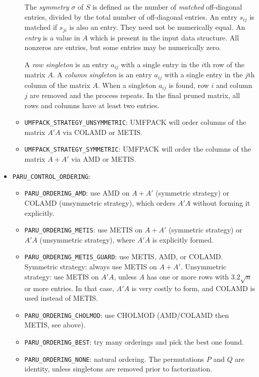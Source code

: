 \documentclass[12pt]{article}
\begin{document}
\begin{itemize}
\begin{itemize}
            The {\em symmetry} $\sigma$ of ${S}$ is defined as the number of
            {\em matched} off-diagonal entries, divided by the total number of
            off-diagonal entries.  An entry $s_{ij}$ is matched if $s_{ji}$ is
            also an entry.  They need not be numerically equal.  An {\em entry}
            is a value in $A$ which is present in the input data structure.
            All nonzeros are entries, but some entries may be numerically zero.

            A {\em row singleton} is an entry $a_{ij}$ with a single entry in
            the $i$th row of the matrix $A$.  A {\em column singleton} is an
            entry $a_{ij}$ with a single entry in the $j$th column of the
            matrix $A$.  When a singleton $a_{ij}$ is found, row $i$ and column
            $j$ are removed and the process repeats.  In the final pruned
            matrix, all rows and columns have at least two entries.

        \item \verb'UMFPACK_STRATEGY_UNSYMMETRIC': UMFPACK will order columns
            of the matrix $A'A$ via COLAMD or METIS.

        \item \verb'UMFPACK_STRATEGY_SYMMETRIC': UMFPACK will order the columns
            of the matrix $A+A'$ via AMD or METIS.

        \end{itemize}

    \item \verb'PARU_CONTROL_ORDERING': %

        \begin{itemize}
        \item \verb'PARU_ORDERING_AMD':
            use AMD on $A+A'$ (symmetric strategy) or COLAMD (unsymmetric
            strategy), which orders $A'A$ without forming it explicitly.
        \item \verb'PARU_ORDERING_METIS': use METIS on $A+A'$ (symmetric
            strategy) or $A'A$ (unsymmetric strategy), where $A'A$ is
            explicitly formed.
        \item \verb'PARU_ORDERING_METIS_GUARD':
            use METIS, AMD, or COLAMD.  Symmetric strategy: always use METIS on
            $A+A'$.  Unsymmetric strategy: use METIS on $A'A$, unless $A$ has
            one or more rows with $3.2\sqrt{n}$ or more entries.  In that case,
            $A'A$ is very costly to form, and COLAMD is used instead of METIS.
        \item \verb'PARU_ORDERING_CHOLMOD':
            use CHOLMOD (AMD/COLAMD then METIS, see above).
        \item \verb'PARU_ORDERING_BEST':
            try many orderings and pick the best one found.
        \item \verb'PARU_ORDERING_NONE':
            natural ordering.  The permutations $P$ and $Q$ are identity,
            unless singletons are removed prior to factorization.
        \end{itemize}


\end{itemize}
\end{document}
